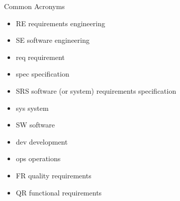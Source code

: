
\begin{Slide}{Common Acronyms}

\begin{itemize}
\item RE   \hfill requirements engineering
\item SE   \hfill software engineering
\item req  \hfill requirement 
\item spec \hfill specification
\item SRS  \hfill software (or system) requirements specification
\item sys  \hfill system
\item SW   \hfill software
\item dev  \hfill development
\item ops  \hfill operations
\item FR   \hfill quality requirements
\item QR   \hfill functional requirements



\end{itemize}
\end{Slide}